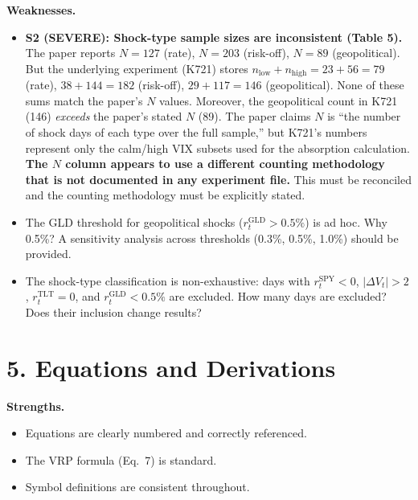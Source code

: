 \documentclass[12pt,a4paper]{article}
\begin{document}
\textbf{Weaknesses.}
\begin{itemize}[nosep]
  \item \textcolor{errorred}{\textbf{S2 (SEVERE): Shock-type sample sizes are inconsistent (Table 5).}}  The paper reports $N = 127$ (rate), $N = 203$ (risk-off), $N = 89$ (geopolitical).  But the underlying experiment (K721) stores $n_{\text{low}} + n_{\text{high}} = 23 + 56 = 79$ (rate), $38 + 144 = 182$ (risk-off), $29 + 117 = 146$ (geopolitical).  None of these sums match the paper's $N$ values.  Moreover, the geopolitical count in K721 (146) \emph{exceeds} the paper's stated $N$ (89).  The paper claims $N$ is ``the number of shock days of each type over the full sample,'' but K721's numbers represent only the calm/high VIX subsets used for the absorption calculation.  \textbf{The $N$ column appears to use a different counting methodology that is not documented in any experiment file.}  This must be reconciled and the counting methodology must be explicitly stated.
  \item The GLD threshold for geopolitical shocks ($r_t^{\text{GLD}} > 0.5\%$) is ad hoc.  Why 0.5\%?  A sensitivity analysis across thresholds (0.3\%, 0.5\%, 1.0\%) should be provided.
  \item The shock-type classification is non-exhaustive: days with $r_t^{\text{SPY}} < 0$, $|\Delta V_t| > 2$, $r_t^{\text{TLT}} = 0$, and $r_t^{\text{GLD}} < 0.5\%$ are excluded.  How many days are excluded?  Does their inclusion change results?
\end{itemize}

\section*{5. Equations and Derivations}

\textbf{Strengths.}
\begin{itemize}[nosep]
  \item Equations are clearly numbered and correctly referenced.
  \item The VRP formula (Eq.~7) is standard.
  \item Symbol definitions are consistent throughout.
\end{itemize}
\end{document}
